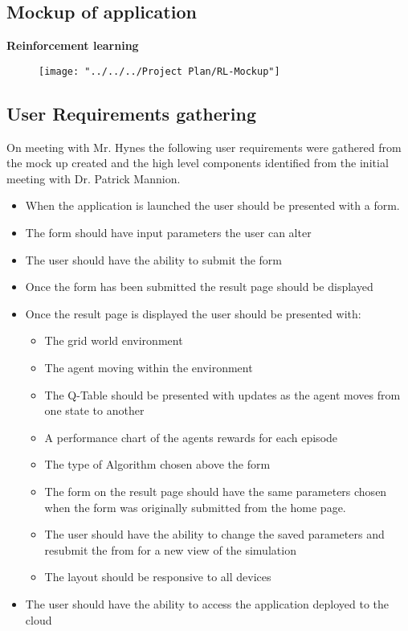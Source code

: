\subsection {Mockup of application}
\textbf{Reinforcement learning}\\
\begin{figure}[H]
	\centering
	\texttt{[image: "../../../Project Plan/RL-Mockup"]}
	\caption{}
	\label{fig:gridworldenv}
\end{figure}

\subsection {User Requirements gathering}
On meeting with Mr. Hynes the following user requirements were gathered from the mock up created and the high level components identified from the initial meeting with Dr. Patrick Mannion.
\begin{itemize}
	\item When the application is launched the user should be presented with a form.
	\item The form should have input parameters the user can alter
	\item The user should have the ability to submit the form
	\item Once the form has been submitted the result page should be displayed 
	\item Once the result page is displayed the user should be presented with:
	\begin{itemize}
		\item The grid world environment
		\item The agent moving within the environment
		\item The Q-Table should be presented with updates as the agent moves from one state to another
		\item A performance chart of the agents rewards for each episode 
		\item The type of Algorithm chosen above the form 
		\item The form on the result page should have the same parameters chosen when the form was originally submitted from the home page.
		\item The user should have the ability to change the saved parameters and resubmit the from for a new view of the simulation
		\item The layout should be responsive to all devices
		
	\end{itemize}
	\item The user should have the ability to access the application deployed to the cloud 
\end{itemize}
